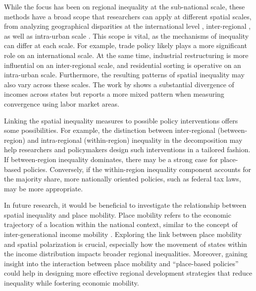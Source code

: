 \documentclass[
  a4paper, 
  twoside,
  final
]{article}
\begin{document}
While the focus has been on regional inequality at the sub-national
scale, these methods have a broad scope that researchers can apply at
different spatial scales, from analyzing geographical disparities at the
international level \citep{redding2004EconomicGeography}, inter-regional
\citep{bathelt2024NatureCauses}, as well as intra-urban scale
\citep{oecd2018DividedCities}. This scope is vital, as the mechanisms of
inequality can differ at each scale. For example, trade policy likely
plays a more significant role on an international scale. At the same
time, industrial restructuring is more influential on an inter-regional
scale, and residential sorting is operative on an intra-urban scale.
Furthermore, the resulting patterns of spatial inequality may also vary
across these scales. The work by \citet{ganong2017WhyHas} shows a
substantial divergence of incomes across states but reports a more mixed
pattern when measuring convergence using labor market areas.

Linking the spatial inequality measures to possible policy interventions
offers some possibilities. For example, the distinction between
inter-regional (between-region) and intra-regional (within-region)
inequality in the decomposition may help researchers and policymakers
design such interventions in a tailored fashion. If between-region
inequality dominates, there may be a strong case for place-based
policies. Conversely, if the within-region inequality component accounts
for the majority share, more nationally oriented policies, such as
federal tax laws, may be more appropriate.

In future research, it would be beneficial to investigate the
relationship between spatial inequality and place mobility. Place
mobility refers to the economic trajectory of a location within the
national context, similar to the concept of inter-generational income
mobility \citep{rey2023SpatialInequality}. Exploring the link between
place mobility and spatial polarization is crucial, especially how the
movement of states within the income distribution impacts broader
regional inequalities. Moreover, gaining insight into the interaction
between place mobility and ``place-based policies'' could help in
designing more effective regional development strategies that reduce
inequality while fostering economic mobility.


  
\end{document}
